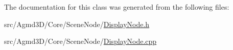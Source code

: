 The documentation for this class was generated from the following files\+:\begin{DoxyCompactItemize}
\item 
src/\+Agmd3\+D/\+Core/\+Scene\+Node/\hyperlink{_display_node_8h}{Display\+Node.\+h}\item 
src/\+Agmd3\+D/\+Core/\+Scene\+Node/\hyperlink{_display_node_8cpp}{Display\+Node.\+cpp}\end{DoxyCompactItemize}
